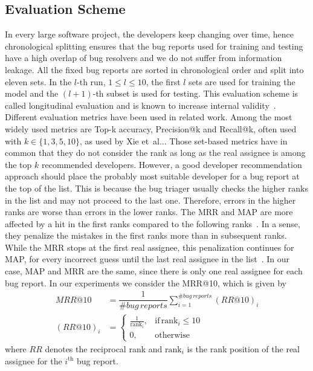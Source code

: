 \documentclass[a4paper,twoside]{article}
\makeatletter
\DeclareRobustCommand\onedot{\futurelet\@let@token\@onedot}
\def\@onedot{\ifx\@let@token.\else.\null\fi\xspace}
\def\etal{et~al\onedot}
\makeatother
\begin{document}
\subsection{Evaluation Scheme}
\label{ssec:evaluation-scheme}
In every large software project, the developers keep changing over time, hence chronological splitting ensures that the bug reports used for training and testing have a high overlap of bug resolvers and we do not suffer from information leakage.
All the fixed bug reports are sorted in chronological order and split into eleven sets.
In the $l$-th run, $1 \le l \le 10$, the first $l$ sets are used for training the model and the $(l+1)$-th subset is used for testing.
This evaluation scheme is called longitudinal evaluation and is known to increase internal validity~\cite{Bhattacharya2010Fine-grainedTriaging,Jonsson2016AutomatedContexts,Mani2019Deeptriage:Triaging,Tamrawi2011FuzzyTriaging,xia2016improving}.
Different evaluation metrics have been used in related work.
Among the most widely used metrics are Top-k accuracy, Precision@k and Recall@k, often used with $k \in \{1, 3, 5, 10\}$, as used by Xie \etal.
Those set-based metrics have in common that they do not consider the rank as long as the real assignee is among the top $k$ recommended developers. 
However, a good developer recommendation approach should place the probably most suitable developer for a bug report at the top of the list.
This is because the bug triager usually checks the higher ranks in the list and may not proceed to the last one.
Therefore, errors in the higher ranks are worse than errors in the lower ranks.
The \ac{MRR} and \ac{MAP} are more affected by a hit in the first ranks compared to the following ranks~\cite{Sajedi-Badashian2020GuidelinesResearch}.
In a sense, they penalize the mistakes in the first ranks more than in subsequent ranks.
While the \ac{MRR} stops at the first real assignee, this penalization continues for \ac{MAP}, for every incorrect guess until the last real assignee in the list~\cite{Sajedi-Badashian2020GuidelinesResearch}.
In our case, \ac{MAP} and \ac{MRR} are the same, since there is only one real assignee for each bug report.
In our experiments we consider the \ac{MRR}@10, which is given by
\begin{align}
        MRR@10 &= \dfrac{1}{\# \mathit{bug\, reports}}\sum \limits_{i = 1}^{\# \mathit{bug\, reports}} (RR@10)_i \\
        (RR@10)_i &= \begin{cases}
        \frac{1}{\text{rank}_i},& \text{if}\, \text{rank}_i\leq 10\\
        0,              & \text{otherwise}
    \end{cases}
\end{align}
where $RR$ denotes the reciprocal rank and $\text{rank}_i$ is the rank position of the real assignee for the $i^{\text{th}}$ bug report.

\end{document}
